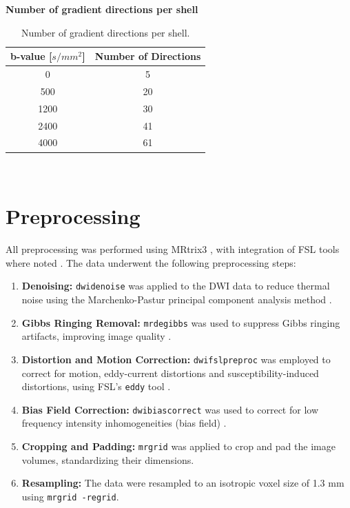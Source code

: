 \begin{table}[H]
    \caption*{\textbf{Number of gradient directions per shell}} %
    \centering 
    \begin{tabular}{|c c|}
    \hline
    \rowcolor{bluepoli!40} %
    \textbf{b-value [$s/mm^2$]} & \textbf{Number of Directions} \T\B \\
    \hline \hline
    0 & 5 \T\B \\
    500 & 20 \T\B \\
    1200 & 30 \T\B \\
    2400 & 41 \T\B \\
    4000 & 61 \B \\
    \hline
    \end{tabular}
    \\[10pt]
    \caption{Number of gradient directions per shell.}
    \label{tab:directions}
\end{table}

\section{Preprocessing}
All preprocessing was performed using MRtrix3 \cite{Tournier2019}, with integration of FSL tools where noted \cite{Smith2004}.
The data underwent the following preprocessing steps:

\begin{enumerate}
    \item \textbf{Denoising:} \texttt{dwidenoise} was applied to the DWI data to reduce thermal noise using the Marchenko-Pastur principal component analysis method \cite{Veraart2016a,Veraart2016b,Cordero-Grande2019}.
    
    \item \textbf{Gibbs Ringing Removal:} \texttt{mrdegibbs} was used to suppress Gibbs ringing artifacts, improving image quality \cite{Kellner2016}.
    
    \item \textbf{Distortion and Motion Correction:} \texttt{dwifslpreproc} was employed to correct for motion, eddy-current distortions and susceptibility-induced distortions, using FSL's \texttt{eddy} tool \cite{Andersson2016}.
    
    \item \textbf{Bias Field Correction:} \texttt{dwibiascorrect} was used to correct for low frequency intensity inhomogeneities (bias field) \cite{Tustison2010}.
    
    \item \textbf{Cropping and Padding:} \texttt{mrgrid} was applied to crop and pad the image volumes, standardizing their dimensions.
    
    \item \textbf{Resampling:} The data were resampled to an isotropic voxel size of 1.3 mm using \texttt{mrgrid -regrid}.
\end{enumerate}

